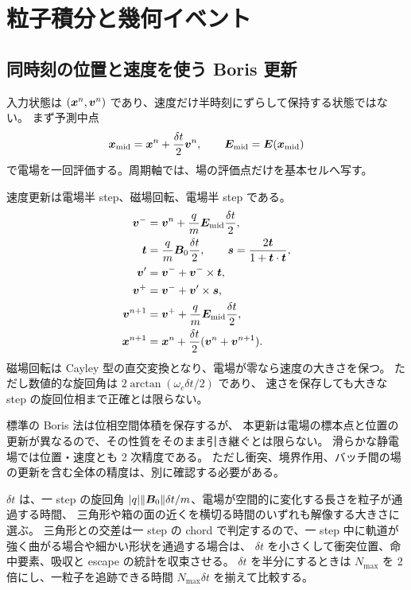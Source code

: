 \chapter{粒子積分と幾何イベント}
\label{ch:particles}

\section{同時刻の位置と速度を使う Boris 更新}
入力状態は $(\bm{x}^n,\bm{v}^n)$ であり、速度だけ半時刻にずらして保持する状態ではない。
まず予測中点
\begin{equation}
 \bm{x}_{\mathrm{mid}}=\bm{x}^n+\frac{\delta t}{2}\bm{v}^n,
 \qquad \bm{E}_{\mathrm{mid}}=\bm{E}(\bm{x}_{\mathrm{mid}})
\end{equation}
で電場を一回評価する。周期軸では、場の評価点だけを基本セルへ写す。

速度更新は電場半 step、磁場回転、電場半 step である。
\begin{align}
 \bm{v}^-&=\bm{v}^n+\frac qm\bm{E}_{\mathrm{mid}}\frac{\delta t}{2},\\
 \bm{t}&=\frac qm\bm{B}_0\frac{\delta t}{2},\qquad
 \bm{s}=\frac{2\bm{t}}{1+\bm{t}\cdot\bm{t}},\\
 \bm{v}'&=\bm{v}^-+\bm{v}^-\times\bm{t},\\
 \bm{v}^+&=\bm{v}^-+\bm{v}'\times\bm{s},\\
 \bm{v}^{n+1}&=\bm{v}^++\frac qm\bm{E}_{\mathrm{mid}}\frac{\delta t}{2},\\
 \bm{x}^{n+1}&=\bm{x}^n+\frac{\delta t}{2}
                  (\bm{v}^n+\bm{v}^{n+1}).
 \label{eq:trapezoid}
\end{align}
磁場回転は Cayley 型の直交変換となり、電場が零なら速度の大きさを保つ。
ただし数値的な旋回角は $2\arctan(\omega_c\delta t/2)$ であり、
速さを保存しても大きな step の旋回位相まで正確とは限らない。

標準の Boris 法は位相空間体積を保存する\citep{Qin2013}が、
本更新は電場の標本点と位置の更新が異なるので、その性質をそのまま引き継ぐとは限らない。
滑らかな静電場では位置・速度とも 2 次精度である。
ただし衝突、境界作用、バッチ間の場の更新を含む全体の精度は、別に確認する必要がある。

$\delta t$ は、一 step の旋回角 $|q|\lVert\bm{B}_0\rVert\delta t/m$、電場が空間的に変化する長さを粒子が通過する時間、
三角形や箱の面の近くを横切る時間のいずれも解像する大きさに選ぶ。
三角形との交差は一 step の chord で判定するので、一 step 中に軌道が強く曲がる場合や細かい形状を通過する場合は、
$\delta t$ を小さくして衝突位置、命中要素、吸収と escape の統計を収束させる。
$\delta t$ を半分にするときは $N_{\max}$ を 2 倍にし、一粒子を追跡できる時間 $N_{\max}\delta t$ を揃えて比較する。

